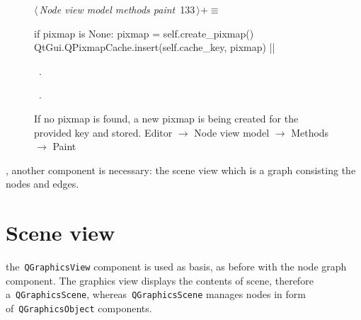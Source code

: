 \documentclass[%
    a4paper,    %
    justified,  %
    nobib,      %
    openany     %
]{tufte-book}
\makeatletter
\renewcommand{\label}[1]{\@tufte@label{##1}}%
\makeatother
\begin{document}
\begin{figure}[!htbp]
\begin{flushleft} \small
\begin{minipage}{\linewidth}\label{scrap79}\raggedright\small
{} $\langle\,${\itshape Node view model methods paint}\nobreak\ {\footnotesize {133}}$\,\rangle+\equiv$
\vspace{-1ex}
\begin{pythoncode}
if pixmap is None:
    pixmap = self.create_pixmap()
    QtGui.QPixmapCache.insert(self.cache_key, pixmap)
|\NWsep|
\end{pythoncode}
\vspace{1.5ex}
\footnotesize
\begin{list}{}{\setlength{\itemsep}{-\parsep}\setlength{\itemindent}{-\leftmargin}}
\item \NWtxtMacroDefBy\ .
\item \NWtxtMacroRefIn\ .

\item{}
\end{list}
\end{minipage}\vspace{4ex}
\end{flushleft}
\caption{If no pixmap is found, a new pixmap is being created for the provided
  key and stored.
  \newline{}\newline{}Editor $\rightarrow$ Node view model $\rightarrow$
  Methods $\rightarrow$ Paint}
\end{figure}

, another component is necessary:
the scene view which is a graph consisting the nodes and edges.

\chapter{Scene view}
\label{appendix:chap:scene-view}

 the~\verb=QGraphicsView= component
is used as basis, as before with the node graph component. The graphics view
displays the contents of scene, therefore a~\verb=QGraphicsScene=,
whereas~\verb=QGraphicsScene= manages nodes in form of~\verb=QGraphicsObject=
components.
\end{document}
